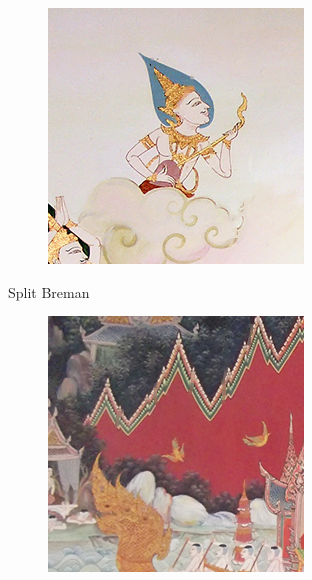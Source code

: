 \documentclass[xcolor=dvipsnames, xetex,serif]{beamer}
\begin{document}
\begin{frame}
\begin{figure}[H]
\begin{subfigure}{0.15\linewidth}
            \end{subfigure}
            \begin{subfigure}{0.15\linewidth}
                \centering
                \includegraphics[width=0.9\linewidth]{images/result_ex4/splitbergman_case05.png}			
            \end{subfigure}
            \caption{Split Breman}
        \end{figure}
        \begin{figure}[H]
            \centering
            \begin{subfigure}{0.15\linewidth}
                \centering
                \includegraphics[width=0.9\linewidth]{images/result_ex4/multisplitbergman_case01.png}

\end{subfigure}
\end{figure}
\end{frame}
\end{document}
